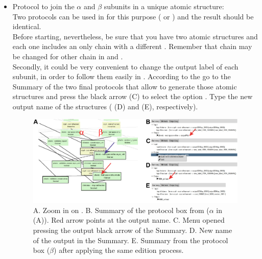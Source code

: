 \begin{itemize}
 \item Protocol to join the  $\alpha$ and $\beta$ subunits in a unique atomic structure:\\ Two protocols can be used in \scipion for this purpose ( or ) and the result should be identical. \\
 Before starting, nevertheless, be sure that you have two atomic structures and each one includes an only chain with a different . Remember that chain  may be changed for other chain  in \chimera and \coot.\\Secondly, it could be very convenient to change the \scipion output label of each subunit, in order to follow them easily in \scipion. According to the  go to the Summary of the two final protocols that allow to generate those atomic structures and press the black arrow (C) to select the option . Type the new output name of the structures ( (D) and  (E), respectively).\\
    
  \begin{figure}[H]
  \centering 
  \captionsetup{width=.9\linewidth} 
  \includegraphics[width=1\textwidth]{Images/Fig75}
  \caption{A. Zoom in on . B. Summary of the protocol box from \phenix {} ($\alpha$ in (A)). Red arrow points at the \scipion output name. C. Menu opened pressing the output black arrow of the Summary. D. New name of the \scipion output in the Summary. E. Summary from the protocol box \phenix {} ($\beta$) after applying the same edition process.}
  \label{fig:scipion_workflow_edition}
  \end{figure}
  

\end{itemize}

